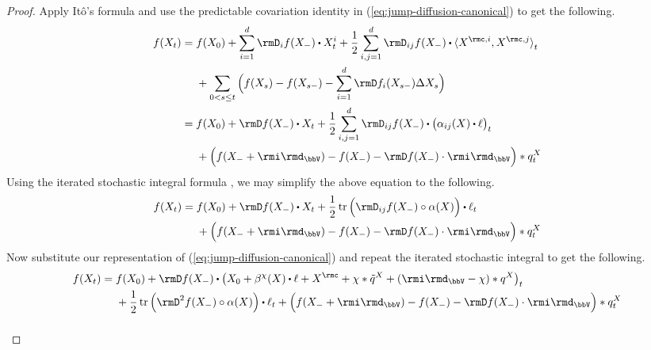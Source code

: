 \begin{proof}
  \label{proof:lemma:ito}
  Apply It\^o's formula \cite[Theorem I.4.57]{jacod2003} and use the predictable covariation identity in (\ref{eq:jump-diffusion-canonical}) to get the following.
  \begin{align*}
    f(\X_t) 
    &= \begin{aligned}[t]
      &f(\X_0) + \sum_{i=1}^d \Der_i f(\X_-) \shortInt \X^i_t + \frac12\sum_{i,j=1}^d \Der_{ij} f(\X_-) \shortInt \prj{\X^{\rmc,i}}{\X^{\rmc,j}}_t \\
      &+ \sum_{0<s\leq t} \Big( f(\X_s) - f(\X_{s-}) - \sum_{i=1}^d \Der f_i(\X_{s-}) \Delta\X_s \Big)
    \end{aligned} \\
    &= \begin{aligned}[t]
      &f(\X_0) + \Der f(\X_-) \shortInt \X_t + \frac12\sum_{i,j=1}^d \Der_{ij} f(\X_-) \shortInt \big(\affDiff_{ij}(\X) \shortInt \leb\big)_t \\
      &+ \Big( f(\X_-+\id_\vecSpace) - f(\X_-) - \Der f(\X_-) \cdot \id_\vecSpace \Big) \ast \jumpMeas^\X_t
    \end{aligned}
  \end{align*}
  Using the iterated stochastic integral formula \cite[Remark I.4.37]{jacod2003}, we may simplify the above equation to the following.
  \begin{equation*}
    f(\X_t) = \begin{aligned}[t]
      &f(\X_0) + \Der f(\X_-) \shortInt \X_t + \frac12 \tr \Big( \Der_{ij} f(\X_-) \circ \affDiff(\X) \Big) \shortInt \leb_t \\
      &+ \Big( f(\X_-+\id_\vecSpace) - f(\X_-) - \Der f(\X_-) \cdot \id_\vecSpace \Big) \ast \jumpMeas^\X_t
    \end{aligned}
  \end{equation*}
  Now substitute our representation of (\ref{eq:jump-diffusion-canonical}) and repeat the iterated stochastic integral to get the following.
  \begin{align*}
    f(\X_t)
    &= \begin{aligned}[t]
      &f(\X_0) + \Der f(\X_-) \shortInt \big( \X_0 + \affDrift^\trunc(\X) \shortInt \leb + \X^\rmc + \trunc \ast \compensate{\jumpMeas^\X} + (\id_\vecSpace-\trunc) \ast \jumpMeas^\X \big)_t \\
      &+ \frac12 \tr\Big( \Hess f(\X_-) \circ \affDiff(\X) \Big)  \shortInt \leb_t  + \Big( f(\X_-+\id_\vecSpace) - f(\X_-) - \Der f(\X_-) \cdot \id_\vecSpace \Big) \ast \jumpMeas^\X_t
    \end{aligned} \\[1em]

\end{align*}
\end{proof}
